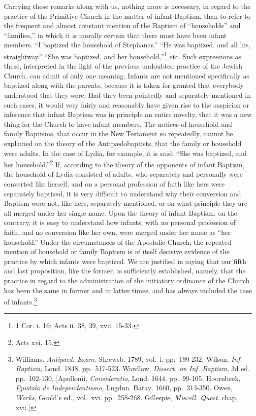 \documentclass[english,]{book}
\begin{document}
Carrying these remarks along with us, nothing more is necessary, in regard to the practice of the Primitive Church in the matter of infant Baptism, than to refer to the frequent and almost constant mention of the Baptism of ``households'' and ``families,'' in which it is morally certain that there must have been infant members. ``I baptized the household of Stephanas.'' ``He was baptized, and all his, straightway.'' ``She was baptized, and her household,''\footnote{1 Cor. i. 16; Acts ii. 38, 39, xvii. 15-33.} etc. Such expressions as these, interpreted in the light of the previous undoubted practice of the Jewish Church, can admit of only one meaning. Infants are not mentioned specifically as baptized along with the parents, because it is taken for granted that everybody understood that they were. Had they been pointedly and separately mentioned in such cases, it would very fairly and reasonably have given rise to the suspicion or inference that infant Baptism was in principle an entire novelty, that it was a new thing for the Church to have infant members. The notices of household and family Baptisms, that occur in the New Testament so repeatedly, cannot be explained on the theory of the Antipædobaptists, that the family or household were adults. In the case of Lydia, for example, it is said: ``She was baptized, and her household.''\footnote{Acts xvi. 15.} If, according to the theory of the opponents of infant Baptism, the household of Lydia consisted of adults, who separately and personally were converted like herself, and on a personal profession of faith like hers were separately baptized, it is very difficult to understand why their conversion and Baptism were not, like hers, separately mentioned, or on what principle they are all merged under her single name. Upon the theory of infant Baptism, on the contrary, it is easy to understand how infants, with no personal profession of faith, and no conversion like her own, were merged under her name as ``her household.'' Under the circumstances of the Apostolic Church, the repeated mention of household or family Baptism is of itself decisive evidence of the practice by which infants were baptized. We are justified in saying that our fifth and last proposition, like the former, is sufficiently established, namely, that the practice in regard to the administration of the initiatory ordinance of the Church has been the same in former and in latter times, and has always included the case of infants.\footnote{Williams, \emph{Antipaed. Exam}. Shrewsb. 1789, vol.~i. pp.~199-232. Wilson, \emph{Inf. Baptism}, Lond. 1848, pp.~517-523. Wardlaw, \emph{Dissert. on Inf. Baptism}, 3d ed. pp.~102-130. {[}Apollonii, \emph{Consideratio}, Lond. 1644, pp.~99-105. Hoornbeek, \emph{Epistola de Independentismo}, Lugdun. Batav. 1660, pp.~313-350. Owen, \emph{Works}, Goold's ed., vol.~xvi. pp.~258-268. Gillespie, \emph{Miscell. Quest}. chap, xvii.{]}}
\end{document}
